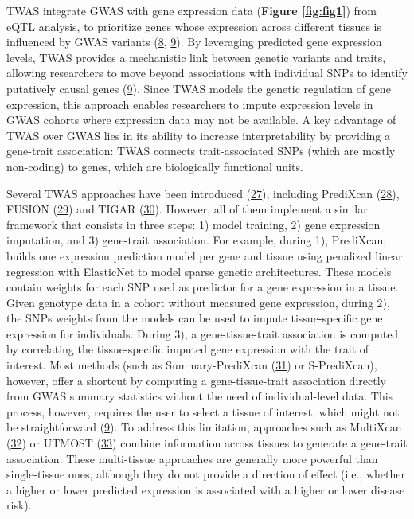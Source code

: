 TWAS integrate GWAS with gene expression data (\textbf{Figure \ref{fig:fig1}}) from eQTL analysis, to prioritize genes whose expression across different tissues is influenced by GWAS variants (\protect\hyperlink{ref-ReOPt75u}{8}, \protect\hyperlink{ref-l6ogswV3}{9}).
By leveraging predicted gene expression levels, TWAS provides a mechanistic link between genetic variants and traits, allowing researchers to move beyond associations with individual SNPs to identify putatively causal genes (\protect\hyperlink{ref-l6ogswV3}{9}).
Since TWAS models the genetic regulation of gene expression, this approach enables researchers to impute expression levels in GWAS cohorts where expression data may not be available.
A key advantage of TWAS over GWAS lies in its ability to increase interpretability by providing a gene-trait association: TWAS connects trait-associated SNPs (which are mostly non-coding) to genes, which are biologically functional units.

Several TWAS approaches have been introduced (\protect\hyperlink{ref-RmhTH35O}{27}), including PrediXcan (\protect\hyperlink{ref-Z8bvDdVq}{28}), FUSION (\protect\hyperlink{ref-1D63fEEPb}{29}) and TIGAR (\protect\hyperlink{ref-19Klmizj8}{30}).
However, all of them implement a similar framework that consists in three steps: 1) model training, 2) gene expression imputation, and 3) gene-trait association.
For example, during 1), PrediXcan, builds one expression prediction model per gene and tissue using penalized linear regression with ElasticNet to model sparse genetic architectures.
These models contain weights for each SNP used as predictor for a gene expression in a tissue.
Given genotype data in a cohort without measured gene expression, during 2), the SNPs weights from the models can be used to impute tissue-specific gene expression for individuals.
During 3), a gene-tissue-trait association is computed by correlating the tissue-specific imputed gene expression with the trait of interest.
Most methods (such as Summary-PrediXcan (\protect\hyperlink{ref-vLyTudUB}{31}) or S-PrediXcan), however, offer a shortcut by computing a gene-tissue-trait association directly from GWAS summary statistics without the need of individual-level data.
This process, however, requires the user to select a tissue of interest, which might not be straightforward (\protect\hyperlink{ref-l6ogswV3}{9}).
To address this limitation, approaches such as MultiXcan (\protect\hyperlink{ref-1FFzCXo1s}{32}) or UTMOST (\protect\hyperlink{ref-93R9hBin}{33}) combine information across tissues to generate a gene-trait association.
These multi-tissue approaches are generally more powerful than single-tissue ones, although they do not provide a direction of effect (i.e., whether a higher or lower predicted expression is associated with a higher or lower disease risk).

